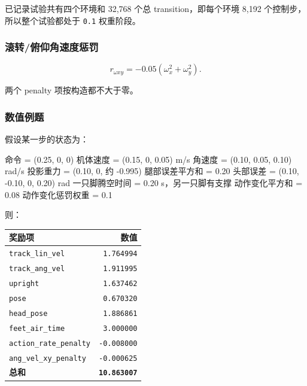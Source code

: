 \documentclass[
  chinese,
  11pt,
  letterpaper,
]{article}
\newenvironment{Shaded}{\begin{snugshade}}{\end{snugshade}}
\newcommand{\NormalTok}[1]{#1}
\newcounter{none} %
\renewenvironment{Shaded}{\par\smallskip}{\par\smallskip}
\begin{document}
\endgroup

已记录试验共有四个环境和 32,768 个总 transition，即每个环境 8,192
个控制步，所以整个试验都处于 \texttt{0.1} 权重阶段。

\subsubsection{滚转/俯仰角速度惩罚}\label{ux6edaux8f6cux4fefux4ef0ux89d2ux901fux5ea6ux60e9ux7f5a}

\[
r_{\omega xy}
=-0.05(\omega_x^2+\omega_y^2).
\]

两个 penalty 项按构造都不大于零。

\subsubsection{数值例题}\label{ux6570ux503cux4f8bux9898}

假设某一步的状态为：

\begingroup\setmonofont{PingFang SC}

\begin{Shaded}
\begin{Highlighting}[]
\NormalTok{命令                 = (0.25, 0, 0)}
\NormalTok{机体速度             = (0.15, 0, 0.05) m/s}
\NormalTok{角速度               = (0.10, 0.05, 0.10) rad/s}
\NormalTok{投影重力             = (0.10, 0, 约 {-}0.995)}
\NormalTok{腿部误差平方和       = 0.20}
\NormalTok{头部误差             = (0.10, {-}0.10, 0, 0.20) rad}
\NormalTok{一只脚腾空时间       = 0.20 s，另一只脚有支撑}
\NormalTok{动作变化平方和       = 0.08}
\NormalTok{动作变化惩罚权重     = 0.1}
\end{Highlighting}
\end{Shaded}

\endgroup

则：

{\def\LTcaptype{none} %
\begin{longtable}[]{@{}lr@{}}
\toprule\noalign{}
奖励项 & 数值 \\
\midrule\noalign{}
\endhead
\bottomrule\noalign{}
\endlastfoot
\texttt{track\_\allowbreak{}lin\_\allowbreak{}vel} &
\texttt{1.764994} \\
\texttt{track\_\allowbreak{}ang\_\allowbreak{}vel} &
\texttt{1.911995} \\
\texttt{upright} & \texttt{1.637462} \\
\texttt{pose} & \texttt{0.670320} \\
\texttt{head\_pose} & \texttt{1.886861} \\
\texttt{feet\_\allowbreak{}air\_\allowbreak{}time} &
\texttt{3.000000} \\
\texttt{action\_\allowbreak{}rate\_\allowbreak{}penalty} &
\texttt{-0.008000} \\
\texttt{ang\_\allowbreak{}vel\_\allowbreak{}xy\_\allowbreak{}penalty} &
\texttt{-0.000625} \\
\textbf{总和} & \textbf{\texttt{10.863007}} \\
\end{longtable}
}
\end{document}
